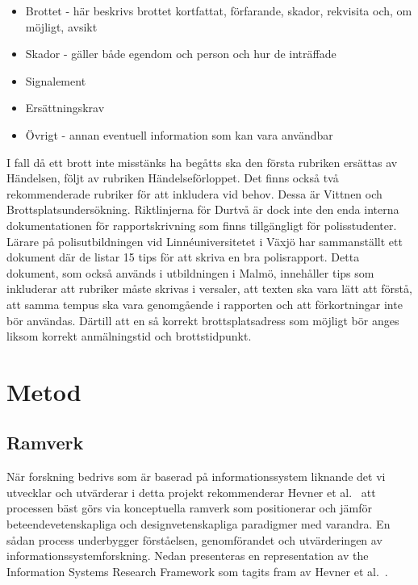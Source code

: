 \documentclass[swedish]{maucsthesis}
\begin{document}
\begin{itemize}
\item Brottet - här beskrivs brottet kortfattat, förfarande, skador, rekvisita
  och, om möjligt, avsikt
\item Skador - gäller både egendom och person och hur de inträffade
\item Signalement
\item Ersättningskrav
\item Övrigt - annan eventuell information som kan vara användbar
\end{itemize}

I fall då ett brott inte misstänks ha begåtts ska den första rubriken ersättas
av Händelsen, följt av rubriken Händelseförloppet. Det finns också två
rekommenderade rubriker för att inkludera vid behov. Dessa är Vittnen och
Brottsplatsundersökning. Riktlinjerna för Durtvå är dock inte den enda interna
dokumentationen för rapportskrivning som finns tillgängligt för polisstudenter.
Lärare på polisutbildningen vid Linnéuniversitetet i Växjö har sammanställt ett
dokument där de listar 15 tips för att skriva en bra polisrapport. Detta
dokument, som också används i utbildningen i Malmö, innehåller tips som
inkluderar att rubriker måste skrivas i versaler, att texten ska vara lätt att
förstå, att samma tempus ska vara genomgående i rapporten och att förkortningar
inte bör användas. Därtill att en så korrekt brottsplatsadress som möjligt bör
anges liksom korrekt anmälningstid och brottstidpunkt.

\section{Metod}

\subsection{Ramverk}

När forskning bedrivs som är baserad på informationssystem liknande det vi
utvecklar och utvärderar i detta projekt rekommenderar Hevner et al.~\cite{hevner:2004} att
processen bäst görs via konceptuella ramverk som positionerar och jämför
beteendevetenskapliga och designvetenskapliga paradigmer med varandra. En sådan
process underbygger förståelsen, genomförandet och utvärderingen av
informationssystemforskning. Nedan presenteras en representation av the
Information Systems Research Framework som tagits fram av Hevner et al.~\cite{hevner:2004}.
\end{document}
